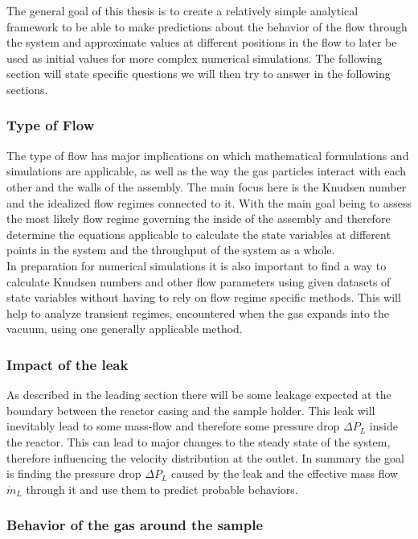 
	The general goal of this thesis is to create a relatively simple analytical framework to be able to make predictions about the behavior of the flow through the system and approximate values at different positions in the flow to later be used as initial values for more complex numerical simulations.
	The following section will state specific questions we will then try to answer in the following sections.
	
\subsubsection*{Type of Flow}

	The type of flow has major implications on which mathematical formulations and simulations are applicable, as well as the way the gas particles interact with each other and the walls of the assembly. 
	The main focus here is the Knudsen number and the idealized flow regimes connected to it.
	With the main goal being to assess the most likely flow regime governing the inside of the assembly and therefore determine the equations applicable to calculate the state variables at different points in the system and the throughput of the system as a whole.\\
	In preparation for numerical simulations it is also important to find a way to calculate Knudsen numbers and other flow parameters using given datasets of state variables without having to rely on flow regime specific methods. This will help to analyze transient regimes, encountered when the gas expands into the vacuum, using one generally applicable method.  

\subsubsection*{Impact of the leak}

	As described in the leading section there will be some leakage expected at the boundary between the reactor casing and the sample holder.
	This leak will inevitably lead to some mass-flow and therefore some pressure drop $\Delta P_L$ inside the reactor.
	This can lead to major changes to the steady state of the system, therefore influencing the velocity distribution at the outlet.
	In summary the goal is finding the pressure drop $\Delta P_L$ caused by the leak and the effective mass flow $\dot{m}_L$ through it and use them to predict probable behaviors.
	
\subsubsection*{Behavior of the gas around the sample}

